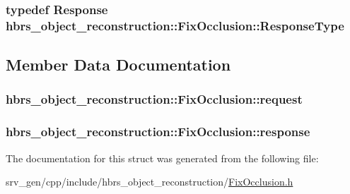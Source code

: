 \hypertarget{structhbrs__object__reconstruction_1_1_fix_occlusion_a0c10bd2d3f7f922be7cdd7f4e141d16f}{
\subsubsection[{\-Response\-Type}]{\setlength{\rightskip}{0pt plus 5cm}typedef {\bf \-Response} {\bf hbrs\-\_\-object\-\_\-reconstruction\-::\-Fix\-Occlusion\-::\-Response\-Type}}}\label{structhbrs__object__reconstruction_1_1_fix_occlusion_a0c10bd2d3f7f922be7cdd7f4e141d16f}


\subsection{\-Member \-Data \-Documentation}
\hypertarget{structhbrs__object__reconstruction_1_1_fix_occlusion_ae597dd1be689ebf51c9b2ace627b8f8e}{
\subsubsection[{request}]{ {\bf hbrs\-\_\-object\-\_\-reconstruction\-::\-Fix\-Occlusion\-::request}}}\label{structhbrs__object__reconstruction_1_1_fix_occlusion_ae597dd1be689ebf51c9b2ace627b8f8e}
\hypertarget{structhbrs__object__reconstruction_1_1_fix_occlusion_ab35c33d90ee8002787e09af86e7fd6cd}{
\subsubsection[{response}]{ {\bf hbrs\-\_\-object\-\_\-reconstruction\-::\-Fix\-Occlusion\-::response}}}\label{structhbrs__object__reconstruction_1_1_fix_occlusion_ab35c33d90ee8002787e09af86e7fd6cd}


\-The documentation for this struct was generated from the following file\-:\begin{DoxyCompactItemize}
\item 
srv\-\_\-gen/cpp/include/hbrs\-\_\-object\-\_\-reconstruction/\hyperlink{_fix_occlusion_8h}{\-Fix\-Occlusion.\-h}\end{DoxyCompactItemize}
